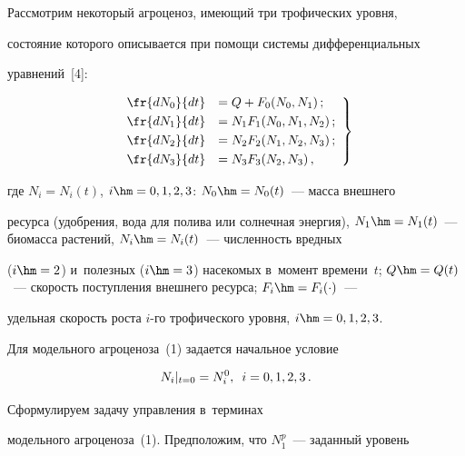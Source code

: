      Рассмотрим некоторый агроценоз, имеющий три трофических уровня, 


состояние которого описывается при помощи системы дифференциальных 


уравнений~[4]: 


     \begin{equation}


     \left.


     \begin{array}{rl}


     \fr{dN_0}{dt} &= Q+F_0(N_0, N_1)\,;\\[3pt]


     \fr{dN_1}{dt} &= N_1F_1(N_0, N_1, N_2)\,;\\[3pt]


     \fr{dN_2}{dt}&= N_2F_2(N_1, N_2, N_3)\,;\\[3pt]


     \fr{dN_3}{dt} &= N_3F_3(N_2, N_3)\,,


     \end{array}


     \right\}


     \label{e1-od}


     \end{equation}


где $N_i=N_i(t)$, $i\hm=0,1, 2, 3$: $N_0\hm=N_0(t)$~--- масса внеш\-не\-го 


ресурса (удоб\-ре\-ния, вода для полива или солнечная энергия), $N_1\hm= 


N_1(t)$~--- био\-мас\-са растений, $N_i\hm= N_i(t)$~--- чис\-лен\-ность вредных  


($i\hm=2$) и~полезных ($i\hm=3$) насекомых в~момент времени~$t$; $Q\hm= 


Q(t)$~---  ско\-рость по\-ступ\-ле\-ния внешнего ресурса; $F_i\hm= F_i(\cdot)$~--- 


удельная ско\-рость рос\-та $i$-го трофического уровня, $i\hm= 0,1,2,3$.





Для модельного агроценоза~(1) задается начальное условие 


$$


N_i\vert_{t=0}  = N_i^0,\enskip  i= 0,1,2,3\,.


$$





 Сформулируем задачу управления в~терминах 


модельного агроценоза~(1). Предположим, что $N_1^p$~--- заданный уровень 


